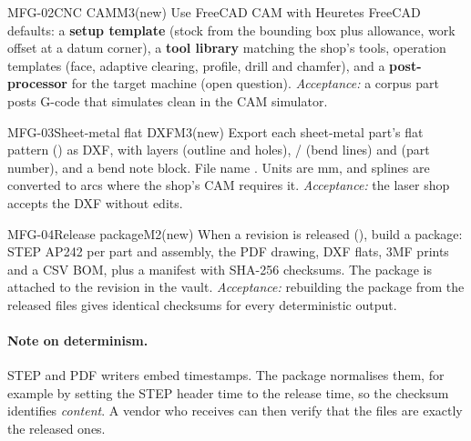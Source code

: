 \begin{epic}{MFG-02}{CNC CAM}{M3}{\stTodo}{(new)}
Use FreeCAD CAM with Heuretes FreeCAD defaults: a \textbf{setup template} (stock from the bounding box plus
allowance, work offset at a datum corner), a \textbf{tool library} matching the shop's tools, operation
templates (face, adaptive clearing, profile, drill and chamfer), and a \textbf{post-processor} for the target
machine (open question).
\emph{Acceptance:} a corpus part posts G-code that simulates clean in the CAM simulator.
\end{epic}

\begin{epic}{MFG-03}{Sheet-metal flat DXF}{M3}{\stTodo}{(new)}
Export each sheet-metal part's flat pattern () as DXF, with layers  (outline and
holes), / (bend lines) and  (part number), and a bend note
block. File name . Units are mm, and splines are converted to arcs where the shop's CAM
requires it.
\emph{Acceptance:} the laser shop accepts the DXF without edits.
\end{epic}

\begin{epic}{MFG-04}{Release package}{M2}{\stTodo}{(new)}
When a revision is released (), build a package: STEP AP242 per part and assembly, the PDF
drawing, DXF flats, 3MF prints and a CSV BOM, plus a manifest with SHA-256 checksums. The package is attached
to the revision in the vault.
\emph{Acceptance:} rebuilding the package from the released files gives identical checksums for every
deterministic output.
\end{epic}

\paragraph{Note on determinism.} STEP and PDF writers embed timestamps. The package normalises them, for
example by setting the STEP header time to the release time, so the checksum identifies \emph{content}.
A vendor who receives  can then verify that the files are exactly the released ones.
